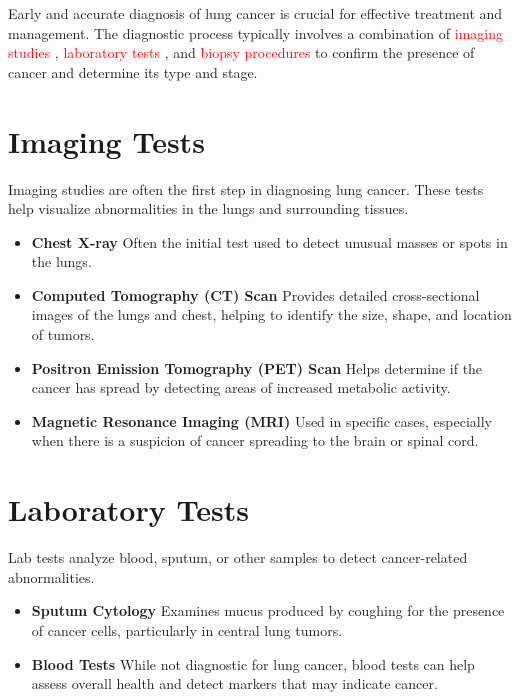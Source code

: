 \begin{remark}
Early and accurate diagnosis of lung cancer is crucial for effective treatment and management. The diagnostic process typically involves a combination of \textcolor{red}{imaging studies} , \textcolor{red}{laboratory tests} , and \textcolor{red}{biopsy procedures} to confirm the presence of cancer and determine its type and stage.
\end{remark}

\section{Imaging Tests} 
Imaging studies are often the first step in diagnosing lung cancer. These tests help visualize abnormalities in the lungs and surrounding tissues.

\begin{highlight}
\begin{itemize}
    \item \textbf{Chest X-ray} Often the initial test used to detect unusual masses or spots in the lungs.
    \item \textbf{Computed Tomography (CT) Scan} Provides detailed cross-sectional images of the lungs and chest, helping to identify the size, shape, and location of tumors.
    \item \textbf{Positron Emission Tomography (PET) Scan} Helps determine if the cancer has spread by detecting areas of increased metabolic activity.
    \item \textbf{Magnetic Resonance Imaging (MRI)} Used in specific cases, especially when there is a suspicion of cancer spreading to the brain or spinal cord.
\end{itemize}
\end{highlight}

\section{Laboratory Tests}
Lab tests analyze blood, sputum, or other samples to detect cancer-related abnormalities.

\begin{highlight}
\begin{itemize}
    \item \textbf{Sputum Cytology} Examines mucus produced by coughing for the presence of cancer cells, particularly in central lung tumors.
    \item \textbf{Blood Tests} While not diagnostic for lung cancer, blood tests can help assess overall health and detect markers that may indicate cancer.
\end{itemize}
\end{highlight}

